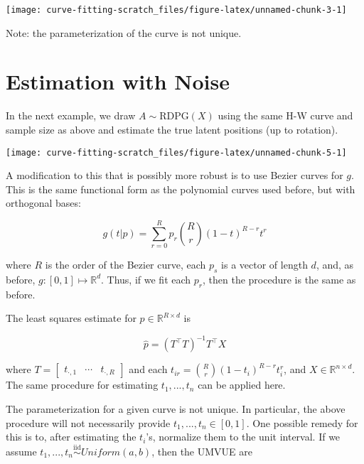 \documentclass[
  11pt,
]{article}
\begin{document}
\begin{center}\texttt{[image: curve-fitting-scratch\_files/figure-latex/unnamed-chunk-3-1]} \end{center}

Note: the parameterization of the curve is not unique.

\hypertarget{estimation-with-noise}{%
\section{Estimation with Noise}\label{estimation-with-noise}}

\begin{example}

In the next example, we draw $A \sim \mathrm{RDPG}(X)$ using the same H-W curve and sample size as above and estimate the true latent positions (up to rotation). 

\end{example}

\begin{center}\texttt{[image: curve-fitting-scratch\_files/figure-latex/unnamed-chunk-5-1]} \end{center}

A modification to this that is possibly more robust is to use Bezier
curves for \(g\). This is the same functional form as the polynomial
curves used before, but with orthogonal bases:

\[g(t | p) = \sum_{r = 0}^{R} p_r \binom{R}{r} (1 - t)^{R - r} t^r\]

where \(R\) is the order of the Bezier curve, each \(p_s\) is a vector
of length \(d\), and, as before, \(g : [0, 1] \mapsto \mathbb{R}^d\).
Thus, if we fit each \(p_r\), then the procedure is the same as before.

The least squares estimate for \(p \in \mathbb{R}^{R \times d}\) is

\[\hat{p} = (T^\top T)^{-1} T^\top X\]

where
\(T = \begin{bmatrix} t_{\cdot, 1} & \cdots & t_{\cdot, R} \end{bmatrix}\)
and each \(t_{ir} = \binom{R}{r} (1 - t_i)^{R - r} t_i^r\), and
\(X \in \mathbb{R}^{n \times d}\). The same procedure for estimating
\(t_1, ..., t_n\) can be applied here.

The parameterization for a given curve is not unique. In particular, the
above procedure will not necessarily provide
\(t_1, ..., t_n \in [0, 1]\). One possible remedy for this is to, after
estimating the \(t_i\)'s, normalize them to the unit interval. If we
assume \(t_1, ..., t_n \stackrel{\mathrm{iid}}{\sim}Uniform(a, b)\),
then the UMVUE are
\end{document}

